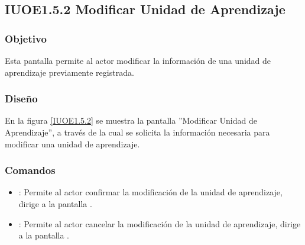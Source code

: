 \subsection{IUOE1.5.2 Modificar Unidad de Aprendizaje}

\subsubsection{Objetivo}
	Esta pantalla permite al actor modificar la información de una unidad de aprendizaje previamente registrada.

\subsubsection{Diseño}
	En la figura \ref{IUOE1.5.2} se muestra la pantalla ''Modificar Unidad de Aprendizaje'', a través de la cual se solicita la información necesaria para modificar una unidad de aprendizaje.


\subsubsection{Comandos}
\begin{itemize}
	\item {}: Permite al actor confirmar la modificación de la unidad de aprendizaje, dirige a la pantalla .
	
	\item {}: Permite al actor cancelar la modificación de la unidad de aprendizaje, dirige a la pantalla .
\end{itemize}
